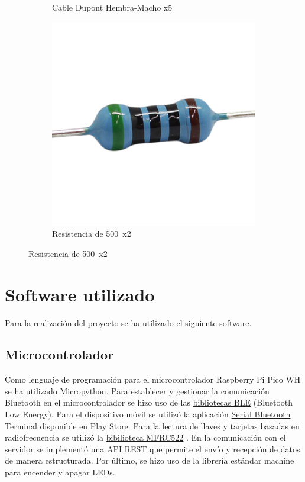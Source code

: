 \documentclass{article}
\begin{document}
\begin{figure}[H]
\begin{subfigure}[b]{0.3\textwidth}
		\caption*{Cable Dupont Hembra-Macho x5}
		\label{fig:cable mh}
	\end{subfigure}
	\hfill
	\begin{subfigure}[b]{0.3\textwidth}
		\includegraphics[width=\textwidth]{../images/resistencia.jpg}
		\caption*{Resistencia de 500\textOmega\ x2}
		\label{fig:resistencia}
	\end{subfigure}
\end{figure}


\section{Software utilizado}
Para la realización del proyecto se ha utilizado el siguiente software.
\subsection{Microcontrolador}
Como lenguaje de programación para el microcontrolador Raspberry Pi Pico WH se ha utilizado Micropython.
Para establecer y gestionar la comunicación Bluetooth en el microcontrolador se hizo uso de las \href{https://github.com/micropython/micropython/tree/master/examples/bluetooth}{bibliotecas BLE} (Bluetooth Low Energy)\cite{micropythonBluetoothExamples}.
Para el dispositivo móvil se utilizó la aplicación \href{https://play.google.com/store/apps/details?id=de.kai_morich.serial_usb_terminal&pcampaignid=web_share}{Serial Bluetooth Terminal}\cite{sam2023ble} disponible en Play Store. Para la lectura de llaves y tarjetas basadas en radiofrecuencia se utilizó la \href{https://github.com/danjperron/micropython-mfrc522/blob/master/mfrc522.py}{bibilioteca MFRC522} \cite{danjperron2022mfrc522}.
En la comunicación con el servidor se implementó una API REST que permite el envío y recepción de datos de manera estructurada. Por último, se hizo uso de la librería estándar machine para encender y apagar LEDs.
\end{document}

